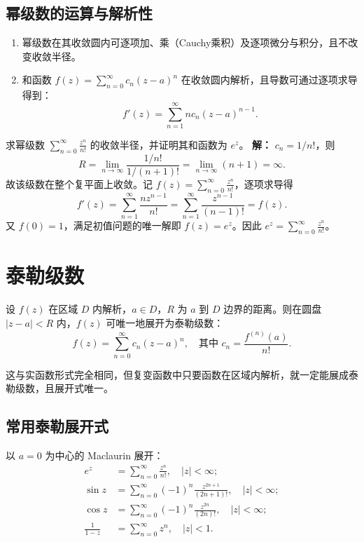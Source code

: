 \subsection{幂级数的运算与解析性}

\begin{tcolorbox}[title=性质, colframe=teal!60!black, colback=teal!5!white, sharp corners]
	\begin{enumerate}
		\item 幂级数在其收敛圆内可逐项加、乘（Cauchy乘积）及逐项微分与积分，且不改变收敛半径。
		\item 和函数 $f(z)=\sum_{n=0}^{\infty} c_n (z-a)^n$ 在收敛圆内解析，且导数可通过逐项求导得到：
		\[
		f'(z) = \sum_{n=1}^{\infty} n c_n (z-a)^{n-1}.
		\]
	\end{enumerate}
\end{tcolorbox}

\begin{tcolorbox}[title=例 1, colframe=orange!75!black, colback=orange!5!white, sharp corners]
	求幂级数 $\displaystyle \sum_{n=0}^{\infty} \frac{z^n}{n!}$ 的收敛半径，并证明其和函数为 $e^z$。
	\tcbline
	\textbf{解：} $c_n = 1/n!$，则
	\[
	R = \lim_{n\to\infty} \frac{1/n!}{1/(n+1)!} = \lim_{n\to\infty} (n+1) = \infty.
	\]
	故该级数在整个复平面上收敛。记 $f(z)=\sum_{n=0}^{\infty} \frac{z^n}{n!}$，逐项求导得
	\[
	f'(z) = \sum_{n=1}^{\infty} \frac{n z^{n-1}}{n!} = \sum_{n=1}^{\infty} \frac{z^{n-1}}{(n-1)!} = f(z).
	\]
	又 $f(0)=1$，满足初值问题的唯一解即 $f(z)=e^z$。因此 $e^z = \sum_{n=0}^{\infty} \frac{z^n}{n!}$。
\end{tcolorbox}

\section{泰勒级数}

\begin{tcolorbox}[title=定理：泰勒展开定理, colframe=green!45!black, colback=green!5!white]
	设 $f(z)$ 在区域 $D$ 内解析，$a\in D$，$R$ 为 $a$ 到 $D$ 边界的距离。则在圆盘 $|z-a|<R$ 内，$f(z)$ 可唯一地展开为泰勒级数：
	\[
	f(z) = \sum_{n=0}^{\infty} c_n (z-a)^n, \quad \text{其中 } c_n = \frac{f^{(n)}(a)}{n!}.
	\]
\end{tcolorbox}

这与实函数形式完全相同，但复变函数中只要函数在区域内解析，就一定能展成泰勒级数，且展开式唯一。

\subsection{常用泰勒展开式}
以 $a=0$ 为中心的 Maclaurin 展开：
\begin{align*}
	e^z &= \sum_{n=0}^{\infty} \frac{z^n}{n!}, \quad |z|<\infty; \\
	\sin z &= \sum_{n=0}^{\infty} (-1)^n \frac{z^{2n+1}}{(2n+1)!}, \quad |z|<\infty; \\
	\cos z &= \sum_{n=0}^{\infty} (-1)^n \frac{z^{2n}}{(2n)!}, \quad |z|<\infty; \\
	\frac{1}{1-z} &= \sum_{n=0}^{\infty} z^n, \quad |z|<1.
\end{align*}

